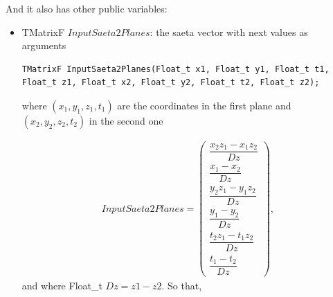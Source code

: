 \documentclass[a4paper]{book}
\let\vec\mathbf  %
\begin{document}
And it also has other public variables:

\begin{itemize}
	\item TMatrixF $InputSaeta2Planes$: the saeta vector with next values as arguments
	
	\begin{lstlisting}[style=customc]
TMatrixF InputSaeta2Planes(Float_t x1, Float_t y1, Float_t t1, Float_t z1, Float_t x2, Float_t y2, Float_t t2, Float_t z2);
	\end{lstlisting}
	
	where $(x_1, y_1, z_1, t_1)$ are the coordinates in the first plane and $(x_2, y_2, z_2, t_2)$ in the second one
	
	
	\begin{align*}
	InputSaeta2Planes = \left(
	\begin{array}{c}
	 \dfrac{x_2 z_1-x_1 z_2}{Dz}\\
	 \dfrac{x_1-x_2}{Dz} \\
	 \dfrac{y_2 z_1-y_1 z_2}{Dz} \\
	 \dfrac{y_1-y_2}{Dz} \\
	 \dfrac{t_2 z_1-t_1 z_2}{Dz} \\
	 \dfrac{t_1-t_2}{Dz}
	\end{array} \right),
	\end{align*}
	and where Float\_t $Dz = z1 - z2$. So that,
	

\end{itemize}
\end{document}
